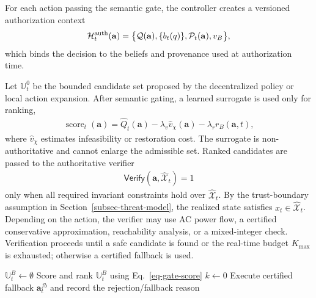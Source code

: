 For each action passing the semantic gate, the controller creates a versioned authorization context
\begin{align}
\label{eq-auth-context}
\mathcal{H}^{\rm auth}_t(\mathbf{a})=
\big\{\mathcal{Q}(\mathbf{a}),\{b_t(q)\},\mathcal{P}_t(\mathbf{a}),v_B\big\},
\end{align}
which binds the decision to the beliefs and provenance used at authorization time.

Let $\mathbb{U}_t^0$ be the bounded candidate set proposed by the decentralized policy or local action expansion. After semantic gating, a learned surrogate is used only for ranking,
\begin{align}
\label{eq-gate-score}
\operatorname{score}_t(\mathbf{a})=
\widehat Q_t(\mathbf{a})-\lambda_v\widehat v_\chi(\mathbf{a})-\lambda_r r_B(\mathbf{a},t),
\end{align}
where $\widehat v_\chi$ estimates infeasibility or restoration cost. The surrogate is non-authoritative and cannot enlarge the admissible set. Ranked candidates are passed to the authoritative verifier
\begin{align}
\label{eq-authoritative-verifier}
\mathsf{Verify}(\mathbf{a},\widehat{\mathcal X}_t)=1
\end{align}
only when all required invariant constraints hold over $\widehat{\mathcal X}_t$. By the trust-boundary assumption in Section~\ref{subsec-threat-model}, the realized state satisfies $x_t\in\widehat{\mathcal X}_t$. Depending on the action, the verifier may use AC power flow, a certified conservative approximation, reachability analysis, or a mixed-integer check. Verification proceeds until a safe candidate is found or the real-time budget $K_{\max}$ is exhausted; otherwise a certified fallback is used.

\begin{algorithm}[t]
\caption{Risk-Aware Recovery Gate}
\label{alg-risk-gate}
$\mathbb{U}_t^B\leftarrow\emptyset$\;
Score and rank $\mathbb{U}_t^B$ using Eq.~\ref{eq-gate-score}\;
$k\leftarrow0$\;
Execute certified fallback $\mathbf{a}_t^{fb}$ and record the rejection/fallback reason\;
\;
\end{algorithm}

